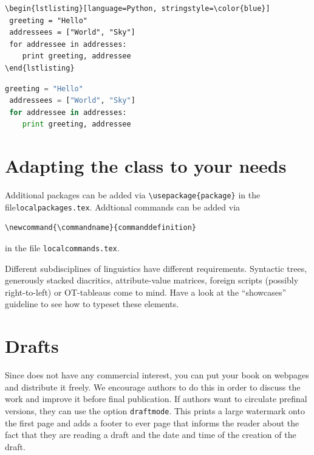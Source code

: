 \begin{verbatim}
\begin{lstlisting}[language=Python, stringstyle=\color{blue}]
 greeting = "Hello"
 addressees = ["World", "Sky"]
 for addressee in addresses:
    print greeting, addressee
\end{lstlisting}
\end{verbatim}
 
\begin{lstlisting}[language=Python, stringstyle=\color{blue}]
 greeting = "Hello"
 addressees = ["World", "Sky"]
 for addressee in addresses:
    print greeting, addressee
\end{lstlisting}

\section{Adapting the class to your needs}

Additional packages can be added via \verb+\usepackage{package}+ in the file\linebreak \verb+localpackages.tex+.
Addtional commands can be added via \begin{verbatim}\newcommand{\commandname}{commanddefinition}\end{verbatim} in the file \verb+localcommands.tex+. 


Different subdisciplines of linguistics have different requirements. Syntactic trees, generously stacked diacritics, attribute-value matrices, foreign scripts (possibly right-to-left) or OT-tableaus come to mind. Have a look at the ``showcases'' guideline to see how to typeset these elements.


 
   
\section{Drafts}

Since \lsp does not have any commercial interest, you can put your book on webpages and distribute it
freely. We encourage authors to do this in order to discuss the work and improve it before final
publication. If authors want to circulate prefinal versions, they can use the option
\texttt{draftmode}. This prints a large watermark onto the first page and adds a footer to ever page
that informs the reader about the fact that they are reading a draft and the date and time of the
creation of the draft.
  

